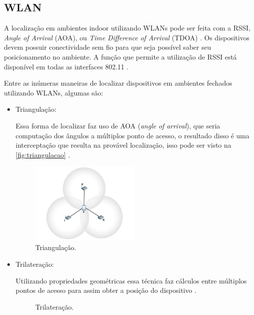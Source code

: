     \subsection{WLAN\label{subsection:wlan}}
    \par
    A localização em ambientes indoor utilizando WLANs pode ser feita com a RSSI, \textit{Angle of Arrival} (AOA), ou \textit{Time Difference of Arrival} (TDOA) \cite{wifiFernandes}. Os dispositivos devem possuir conectividade sem fio para que seja possível saber seu posicionamento no ambiente. A função que permite a utilização de RSSI está disponível em todas as interfaces 802.11 \cite{Wlan2012}.
    
    \par
    Entre as inúmeras maneiras de localizar dispositivos em ambientes fechados utilizando WLANs, algumas são:
    \begin{itemize}
        \item {Triangulação:}
        \par
        Essa forma de localizar faz uso de AOA (\textit{angle of arrival}), que seria computação dos ângulos a múltiplos ponto de acesso, o resultado disso é uma interceptação que resulta na provável localização, isso pode ser visto na \autoref{fig:triangulacao} \cite{wifiFernandes}.
           \begin{figure}[H]
              \caption{\label{fig:triangulacao}{Triangulação.}}
              \centering
              \includegraphics[width=0.5\textwidth]{Figuras/triangulacao.PNG}
        \end{figure}
        \item {Trilateração: }
        \par
       Utilizando propriedades geométricas essa técnica faz cálculos entre múltiplos pontos de acesso para assim obter a posição do dispositivo \cite{wifiFernandes}.
        \begin{figure}[H]
              \caption{\label{fig:trilateracao}{Trilateração.}}

\end{figure}
\end{itemize}
